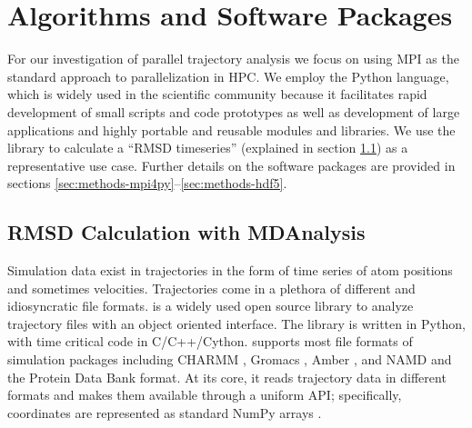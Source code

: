 
\section{Algorithms and Software Packages}
\label{sec:packages}

For our investigation of parallel trajectory analysis we focus on using MPI as the standard approach to parallelization in HPC.
We employ the Python language, which is widely used in the scientific community because it facilitates rapid development of small scripts and code prototypes as well as development of large applications and highly portable and reusable modules and libraries.
We use the  library to calculate a ``RMSD timeseries'' (explained in section \ref{sec:mda}) as a representative use case.
Further details on the software packages are provided in sections \ref{sec:methods-mpi4py}--\ref{sec:methods-hdf5}.


\subsection{RMSD Calculation with MDAnalysis}
\label{sec:mda}

Simulation data exist in trajectories in the form of time series of atom positions and sometimes velocities.
Trajectories come in a plethora of different and idiosyncratic file formats. 
 \cite{Gowers:2016aa, Michaud-Agrawal:2011fu} is a widely used open source library to analyze trajectory files with an object oriented interface. 
The library is written in Python, with time critical code in C/C++/Cython. 
 supports most file formats of simulation packages including CHARMM \cite{Brooks:2009pt}, Gromacs \cite{Abraham:2015aa}, Amber \cite{Case:2005uq}, and NAMD \cite{Phillips:2005ek} and the Protein Data Bank \cite{Burley:2018aa} format.
At its core, it reads trajectory data in different formats and makes them available through a uniform API; specifically, coordinates are represented as standard NumPy arrays \cite{Van-Der-Walt:2011aa}.



